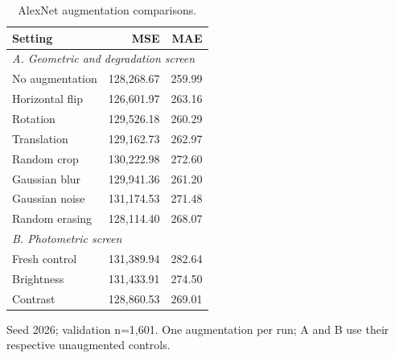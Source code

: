 \begin{table}[t]
\centering
\caption{AlexNet augmentation comparisons.}
\label{tab:augmentation-zh}
\small
\setlength{\tabcolsep}{3pt}
\begin{tabular*}{\columnwidth}{@{\extracolsep{\fill}}lrr@{}}
\hline
Setting & MSE & MAE \\
\hline
\multicolumn{3}{l}{\emph{A. Geometric and degradation screen}} \\
No augmentation & 128,268.67 & 259.99 \\
Horizontal flip & 126,601.97 & 263.16 \\
Rotation & 129,526.18 & 260.29 \\
Translation & 129,162.73 & 262.97 \\
Random crop & 130,222.98 & 272.60 \\
Gaussian blur & 129,941.36 & 261.20 \\
Gaussian noise & 131,174.53 & 271.48 \\
Random erasing & 128,114.40 & 268.07 \\
\multicolumn{3}{l}{\emph{B. Photometric screen}} \\
Fresh control & 131,389.94 & 282.64 \\
Brightness & 131,433.91 & 274.50 \\
Contrast & 128,860.53 & 269.01 \\
\hline
\end{tabular*}
\par\smallskip
\begin{minipage}{\columnwidth}\scriptsize
Seed 2026; validation n=1,601. One augmentation per run; A and B use their respective unaugmented controls.
\end{minipage}
\end{table}
